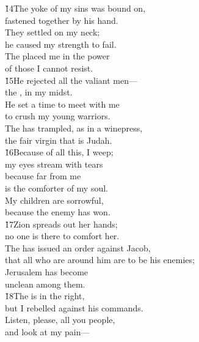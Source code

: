 \begin{poetry}
\poeml \v{14}The yoke of my sins was bound on, \\
\poemll    fastened together by his hand. \\
\poeml They settled on my neck; \\
\poemll    he caused my strength to fail. \\
\poeml The  placed me in the power \\
\poemll    of those I cannot resist. \\
\poeml \v{15}He rejected all the valiant men--- \\
\poemll    the , in my midst. \\
\poeml He set a time to meet with me \\
\poemll    to crush my young warriors. \\
\poeml The  has trampled, as in a winepress, \\
\poemll    the fair virgin that is Judah. \\
\poeml \v{16}Because of all this, I weep; \\
\poemll    my eyes stream with tears \\
\poeml because far from me \\
\poemll    is the comforter of my soul. \\
\poeml My children are sorrowful, \\
\poemll    because the enemy has won. \\
\poeml \v{17}Zion spreads out her hands; \\
\poemll    no one is there to comfort her. \\
\poeml The  has issued an order against Jacob, \\
\poemll    that all who are around him are to be his enemies; \\
\poeml Jerusalem has become \\
\poemll    unclean among them. \\
\poeml \v{18}The  is in the right, \\
\poemll    but I rebelled against his commands. \\
\poeml Listen, please, all you people, \\
\poemll    and look at my pain--- \\

\end{poetry}

